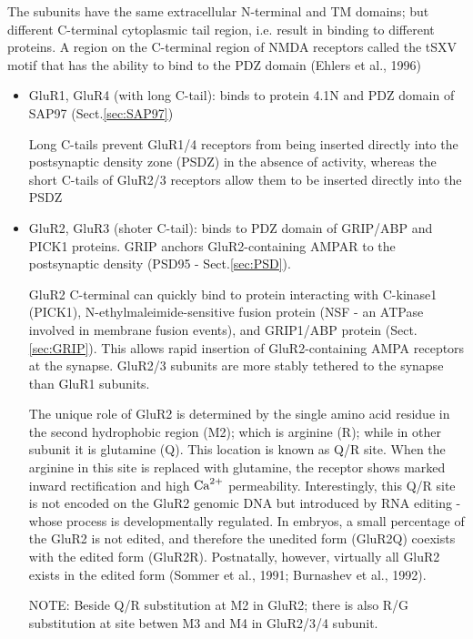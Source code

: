 The subunits have the same extracellular N-terminal and TM domains; but
different C-terminal  cytoplasmic tail region, i.e. result in binding to
different proteins. A region on the C-terminal region of NMDA receptors called
the tSXV motif that has the ability to bind to the PDZ domain (Ehlers et al.,
1996)

\begin{itemize}
  \item GluR1, GluR4 (with long C-tail): binds to protein 4.1N and PDZ domain of
  SAP97 (Sect.\ref{sec:SAP97})
  
  Long C-tails prevent GluR1/4 receptors from being inserted directly into the
  postsynaptic density zone (PSDZ) in the absence of activity, whereas the short
  C-tails of GluR2/3 receptors allow them to be inserted directly into the PSDZ
  
  \item GluR2, GluR3 (shoter C-tail): binds to PDZ domain of GRIP/ABP and PICK1
  proteins. GRIP anchors GluR2-containing AMPAR to the postsynaptic density
  (PSD95 - Sect.\ref{sec:PSD}).

GluR2 C-terminal can quickly bind to protein interacting with C-kinase1
(PICK1), N-ethylmaleimide-sensitive fusion protein (NSF - an ATPase involved in
membrane fusion events), and GRIP1/ABP protein (Sect.\ref{sec:GRIP}). This
allows rapid insertion of GluR2-containing AMPA receptors at the synapse.
GluR2/3 subunits are more stably tethered to the synapse than GluR1 subunits.

The unique role of GluR2 is determined by the single amino acid residue in the
second hydrophobic region (M2); which is arginine (R); while in other subunit it
is glutamine (Q). This location is known as Q/R site.
When the arginine in this site is replaced with glutamine, the receptor shows
marked inward rectification and high ${\text{Ca}^{2+}}$ permeability.
Interestingly, this Q/R site is not encoded on the GluR2 genomic DNA but
introduced by RNA editing - whose process is developmentally regulated.
In embryos, a small percentage of the GluR2 is not edited, and therefore the
unedited form (GluR2Q) coexists with the edited form (GluR2R).
Postnatally, however, virtually all GluR2 exists in the edited form (Sommer et
al., 1991; Burnashev et al., 1992).

NOTE: Beside Q/R substitution at M2 in GluR2; there is also R/G substitution at
site betwen M3 and M4 in GluR2/3/4 subunit.

\end{itemize}
   

